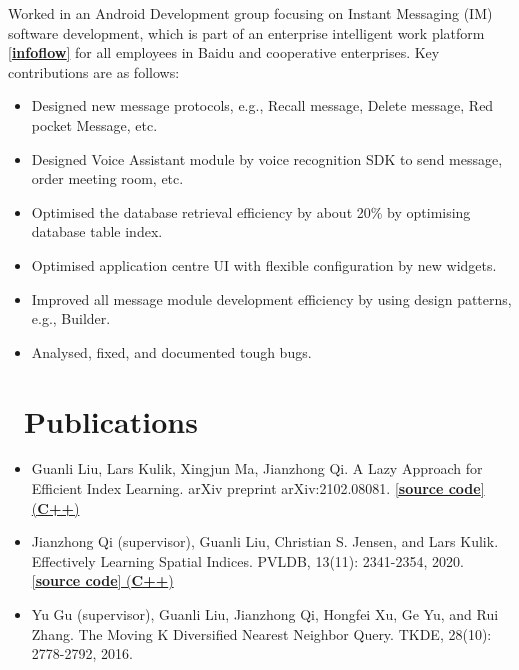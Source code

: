 \documentclass{resume}
\begin{document}
Worked in an Android Development group focusing on Instant Messaging (IM) software development, which is part of an enterprise intelligent work platform \href{https://infoflow.baidu.com/}{[\textbf{infoflow}]} for all employees in Baidu and cooperative enterprises.
Key contributions are as follows:

\begin{itemize}
  \item Designed new message protocols, e.g., Recall message, Delete message, Red pocket Message, etc.
  \item Designed Voice Assistant module by voice recognition SDK to send message, order meeting room, etc.
  \item Optimised the database retrieval efficiency by about 20\% by optimising database table index.
  \item Optimised application centre UI with flexible configuration by new widgets.
  \item Improved all message module development efficiency by using design patterns, e.g., Builder.
  \item Analysed, fixed, and documented tough bugs.
\end{itemize}

\section{\faFilesO\ Publications}
\begin{itemize}
 \item Guanli Liu, Lars Kulik, Xingjun Ma, Jianzhong Qi. A Lazy Approach for Efficient Index Learning. arXiv preprint arXiv:2102.08081. \href{https://github.com/Liuguanli/ModelReuse}{[\textbf{source code}] (\textbf{C++})} 
 
  \item Jianzhong Qi (supervisor), Guanli Liu, Christian S. Jensen, and Lars Kulik. Effectively Learning Spatial Indices. PVLDB, 13(11): 2341-2354, 2020.  \href{https://github.com/Liuguanli/RSMI}{[\textbf{source code}] (\textbf{C++})}

  \item Yu Gu (supervisor), Guanli Liu, Jianzhong Qi, Hongfei Xu, Ge Yu, and Rui Zhang. The Moving K Diversified Nearest Neighbor Query. TKDE, 28(10): 2778-2792, 2016.
\end{itemize}
\end{document}
